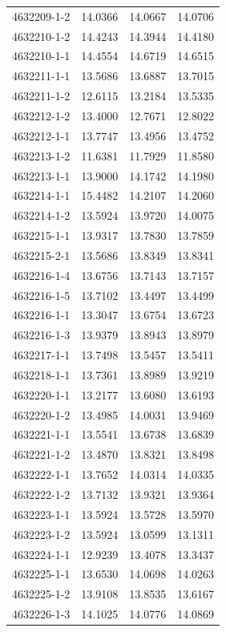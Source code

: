 \begin{longtable}{lrrr}
4632209-1-2 & 14.0366 & 14.0667 & 14.0706 \\
4632210-1-2 & 14.4243 & 14.3944 & 14.4180 \\
4632210-1-1 & 14.4554 & 14.6719 & 14.6515 \\
4632211-1-1 & 13.5686 & 13.6887 & 13.7015 \\
4632211-1-2 & 12.6115 & 13.2184 & 13.5335 \\
4632212-1-2 & 13.4000 & 12.7671 & 12.8022 \\
4632212-1-1 & 13.7747 & 13.4956 & 13.4752 \\
4632213-1-2 & 11.6381 & 11.7929 & 11.8580 \\
4632213-1-1 & 13.9000 & 14.1742 & 14.1980 \\
4632214-1-1 & 15.4482 & 14.2107 & 14.2060 \\
4632214-1-2 & 13.5924 & 13.9720 & 14.0075 \\
4632215-1-1 & 13.9317 & 13.7830 & 13.7859 \\
4632215-2-1 & 13.5686 & 13.8349 & 13.8341 \\
4632216-1-4 & 13.6756 & 13.7143 & 13.7157 \\
4632216-1-5 & 13.7102 & 13.4497 & 13.4499 \\
4632216-1-1 & 13.3047 & 13.6754 & 13.6723 \\
4632216-1-3 & 13.9379 & 13.8943 & 13.8979 \\
4632217-1-1 & 13.7498 & 13.5457 & 13.5411 \\
4632218-1-1 & 13.7361 & 13.8989 & 13.9219 \\
4632220-1-1 & 13.2177 & 13.6080 & 13.6193 \\
4632220-1-2 & 13.4985 & 14.0031 & 13.9469 \\
4632221-1-1 & 13.5541 & 13.6738 & 13.6839 \\
4632221-1-2 & 13.4870 & 13.8321 & 13.8498 \\
4632222-1-1 & 13.7652 & 14.0314 & 14.0335 \\
4632222-1-2 & 13.7132 & 13.9321 & 13.9364 \\
4632223-1-1 & 13.5924 & 13.5728 & 13.5970 \\
4632223-1-2 & 13.5924 & 13.0599 & 13.1311 \\
4632224-1-1 & 12.9239 & 13.4078 & 13.3437 \\
4632225-1-1 & 13.6530 & 14.0698 & 14.0263 \\
4632225-1-2 & 13.9108 & 13.8535 & 13.6167 \\
4632226-1-3 & 14.1025 & 14.0776 & 14.0869 \\

\end{longtable}
